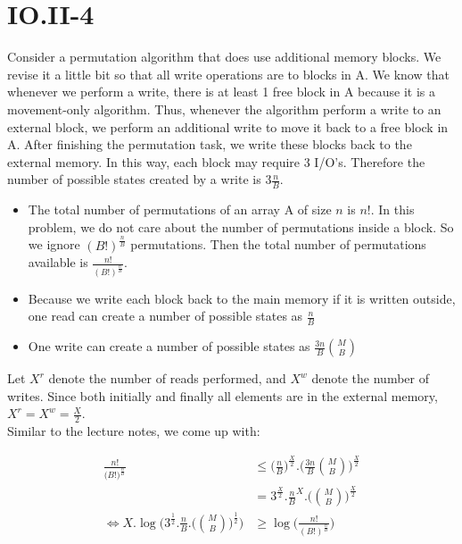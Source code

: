 \section*{IO.II-4}
Consider a permutation algorithm that does use additional memory blocks. We revise it a little bit so that all write operations are 
to blocks in A. We know that whenever we perform a write, there is at least 1 free block in A because it is a movement-only 
algorithm. Thus, whenever the algorithm perform a write to an external block, we perform an additional write to move it back to a
free block in A. After finishing the permutation task, we write these blocks back to the external memory. In this way, each block may require 3 I/O's. Therefore the number of possible states created by a write is $3\frac{n}{B} $. \\

\begin{itemize} 
  \item The total number of permutations of an array A of size $n$ is $n!$. In this problem, we do not care about the number of 
permutations inside a block. So we ignore $(B!)^{\frac{n}{B} }$ permutations. Then the total number of permutations available is 
$\frac{n!}{(B!)^{\frac{n}{B} }}$.
\item Because we write each block back to the main memory if it is written outside, one read can create a number of possible states as $\frac{n}{B} $
\item One write can create a number of possible states as $\frac{3n}{B} \binom MB$
\end{itemize}

Let $X^r$ denote the number of reads performed, and $X^w$ denote the number of writes. Since both initially and finally all elements are in the external memory, $X^r = X^w = \frac{X}{2}$. \\ 

Similar to the lecture notes, we come up with:

\begin{equation*}
  \begin{aligned}
  \frac{n!}{\big(B!\big)^{\frac{n}{B}}} &\leq \bigg(\frac{n}{B} \bigg)^{\frac{X}{2}} . \bigg(\frac{3n}{B} \binom MB\bigg)^{\frac{X}{2}} \\
  &= 3^{\frac{X}{2}}.\frac{n}{B}^X.\bigg(\binom MB\bigg)^{\frac{X}{2}} \\
  \iff X.\log \bigg(3^\frac{1}{2}.\frac{n}{B}.\bigg(\binom MB\bigg)^\frac{1}{2} \bigg) &\geq \log \bigg(\frac{n!}{(B!)^{\frac{n}{B}}}\bigg)
\end{aligned}
\end{equation*}

